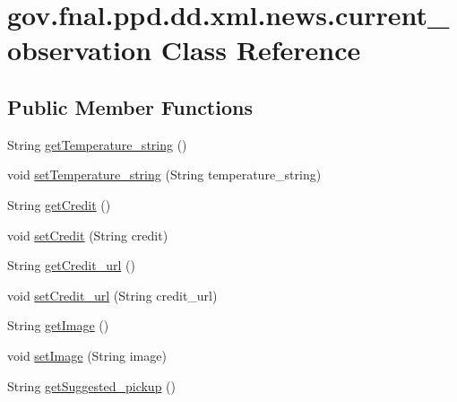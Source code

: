 \hypertarget{classgov_1_1fnal_1_1ppd_1_1dd_1_1xml_1_1news_1_1current__observation}{\section{gov.\-fnal.\-ppd.\-dd.\-xml.\-news.\-current\-\_\-observation Class Reference}
\label{classgov_1_1fnal_1_1ppd_1_1dd_1_1xml_1_1news_1_1current__observation}
}
\subsection*{Public Member Functions}
\begin{DoxyCompactItemize}
\item 
String \hyperlink{classgov_1_1fnal_1_1ppd_1_1dd_1_1xml_1_1news_1_1current__observation_a1c019a92d90c5d1863de23290e46555c}{get\-Temperature\-\_\-string} ()
\item 
void \hyperlink{classgov_1_1fnal_1_1ppd_1_1dd_1_1xml_1_1news_1_1current__observation_a2e9a1a5d33d49074decc164be4489d59}{set\-Temperature\-\_\-string} (String temperature\-\_\-string)
\item 
String \hyperlink{classgov_1_1fnal_1_1ppd_1_1dd_1_1xml_1_1news_1_1current__observation_af12af655b1d0180a010b18f76a5e8205}{get\-Credit} ()
\item 
void \hyperlink{classgov_1_1fnal_1_1ppd_1_1dd_1_1xml_1_1news_1_1current__observation_a8e2e20aa14ec19e9fc69decf8e6a0961}{set\-Credit} (String credit)
\item 
String \hyperlink{classgov_1_1fnal_1_1ppd_1_1dd_1_1xml_1_1news_1_1current__observation_aeae0ae8bc486982546364ea64da1f63a}{get\-Credit\-\_\-url} ()
\item 
void \hyperlink{classgov_1_1fnal_1_1ppd_1_1dd_1_1xml_1_1news_1_1current__observation_aa105c79e173d65693b4db03267730d5e}{set\-Credit\-\_\-url} (String credit\-\_\-url)
\item 
String \hyperlink{classgov_1_1fnal_1_1ppd_1_1dd_1_1xml_1_1news_1_1current__observation_ac75f8b78c6c3216c845c04463e372775}{get\-Image} ()
\item 
void \hyperlink{classgov_1_1fnal_1_1ppd_1_1dd_1_1xml_1_1news_1_1current__observation_aac0bf2b87a3d96b5722a0480a8078cac}{set\-Image} (String image)
\item 
String \hyperlink{classgov_1_1fnal_1_1ppd_1_1dd_1_1xml_1_1news_1_1current__observation_a3d810434c8dcba4882e929e472bf358c}{get\-Suggested\-\_\-pickup} ()

\end{DoxyCompactItemize}
